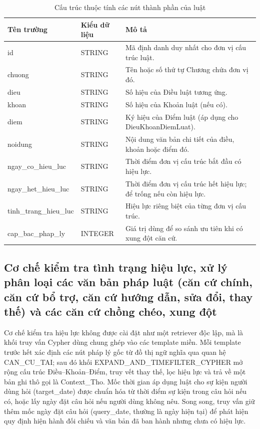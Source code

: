 \documentclass[../DoAn.tex]{subfiles}
\begin{document}
\begin{table}[H]
\centering
\footnotesize
\begin{tabularx}{\textwidth}{|>{\raggedright\arraybackslash}p{3.1cm}|>{\raggedright\arraybackslash}p{2.1cm}|>{\raggedright\arraybackslash}X|}
\hline
\textbf{Tên trường} & \textbf{Kiểu dữ liệu} & \textbf{Mô tả} \\ \hline
id & STRING & Mã định danh duy nhất cho đơn vị cấu trúc luật. \\ \hline
chuong & STRING & Tên hoặc số thứ tự Chương chứa đơn vị đó. \\ \hline
dieu & STRING & Số hiệu của Điều luật tương ứng. \\ \hline
khoan & STRING & Số hiệu của Khoản luật (nếu có). \\ \hline
diem & STRING & Ký hiệu của Điểm luật (áp dụng cho DieuKhoanDiemLuat). \\ \hline
noidung & STRING & Nội dung văn bản chi tiết của điều, khoản hoặc điểm đó. \\ \hline
ngay\_\allowbreak co\_\allowbreak hieu\_\allowbreak luc & STRING & Thời điểm đơn vị cấu trúc bắt đầu có hiệu lực. \\ \hline
ngay\_\allowbreak het\_\allowbreak hieu\_\allowbreak luc & STRING & Thời điểm đơn vị cấu trúc hết hiệu lực; để trống nếu còn hiệu lực. \\ \hline
tinh\_\allowbreak trang\_\allowbreak hieu\_\allowbreak luc & STRING & Hiệu lực riêng biệt của từng đơn vị cấu trúc. \\ \hline
cap\_\allowbreak bac\_\allowbreak phap\_\allowbreak ly & INTEGER & Giá trị dùng để so sánh ưu tiên khi có xung đột căn cứ. \\ \hline
\end{tabularx}
\caption{Cấu trúc thuộc tính các nút thành phần của luật}
\label{tab:kg_luat_component_properties}
\end{table}

\subsection{Cơ chế kiểm tra tình trạng hiệu lực, xử lý phân loại các văn bản pháp luật (căn cứ chính, căn cứ bổ trợ, căn cứ hướng dẫn, sửa đổi, thay thế) và các căn cứ chồng chéo, xung đột}

Cơ chế kiểm tra hiệu lực không được cài đặt như một retriever độc lập, mà là khối truy vấn Cypher dùng chung ghép vào các template miền. Mỗi template trước hết xác định các nút pháp lý gốc từ đồ thị ngữ nghĩa qua quan hệ CAN\_CU\_TAI; sau đó khối EXPAND\_AND\_TIMEFILTER\_CYPHER mở rộng cấu trúc Điều--Khoản--Điểm, truy vết thay thế, lọc hiệu lực và trả về một bản ghi thô gọi là Context\_Tho. Mốc thời gian áp dụng luật cho sự kiện người dùng hỏi (target\_date) được chuẩn hóa từ thời điểm sự kiện trong câu hỏi nếu có, hoặc lấy ngày đặt câu hỏi nếu người dùng không nêu. Song song, truy vấn giữ thêm mốc ngày đặt câu hỏi (query\_date, thường là ngày hiện tại) để phát hiện quy định hiện hành đối chiếu và văn bản đã ban hành nhưng chưa có hiệu lực.
\end{document}
